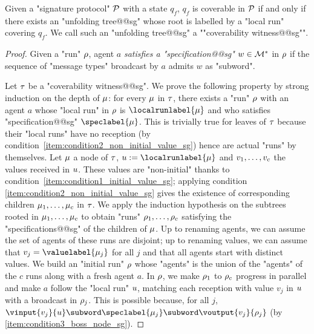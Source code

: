 \begin{lemma}
\label{lem:coverability_witness_sg}
Given a "signature protocol" $\mathcal{P}$ with a state $q_f$, $q_f$ is coverable in $\mathcal{P}$ if and only if there exists an "unfolding tree@@sg" whose root is labelled by a "local run" covering $q_f$. We call such an "unfolding tree@@sg" a ""coverability witness@@sg"".
\end{lemma}
\begin{proof}
Given a "run" $\rho$, agent $a$ \emph{satisfies a "specification@@sg"} $w \in \mathcal{M}^*$ in $\rho$ if the sequence of "message types" broadcast by $a$ admits $w$ as "subword".%

Let $\tau$ be a "coverability witness@@sg". 
We prove the following property by strong induction on the depth of $\mu$: for every $\mu$ in $\tau$, there exists a "run" $\rho$ with an agent $a$ whose "local run" in $\rho$ is $\localrunlabel{\node}$ and who satisfies "specification@@sg" $\speclabel{\node}$. This is trivially true for leaves of $\tau$ because their "local runs" have no reception (by condition~\ref{item:condition2_non_initial_value_sg}) hence are actual "runs" by themselves. 
Let $\mu$ a node of $\tau$, $\localrun := \localrunlabel{\node}$ and $v_1, \dots, v_c$ the values received in $u$. 
These values are "non-initial" thanks to condition~\ref{item:condition1_initial_value_sg}; applying condition \ref{item:condition2_non_initial_value_sg} gives the existence of corresponding children $\mu_1, \dots, \mu_c$ in $\tau$. 
We apply the induction hypothesis on the subtrees rooted in $\mu_1, \dots, \mu_c$ to obtain "runs" $\rho_1, \dots, \rho_c$ satisfying the "specifications@@sg" of the children of $\mu$. 
Up to renaming agents, we can assume the set of agents of these runs are disjoint; up to renaming values, we can assume that $\aval_j = \valuelabel{\node_j}$ for all $j$ and that all agents start with distinct values. 
We build an "initial run" $\rho$ whose "agents" is the union of the "agents" of the $c$ runs along with a fresh agent $a$. In $\rho$, we make $\rho_1$ to $\rho_c$ progress in parallel and make $a$ follow the "local run" $u$, matching each reception with value $v_j$ in $u$ with a broadcast in $\rho_j$. 
This is possible because, for all $j$, $\vinput{v_j}{\localrun} \subword \speclabel{\node_j} \subword \voutput{v_j}{\run_j}$ (by \ref{item:condition3_boss_node_sg}). 


\end{proof}
